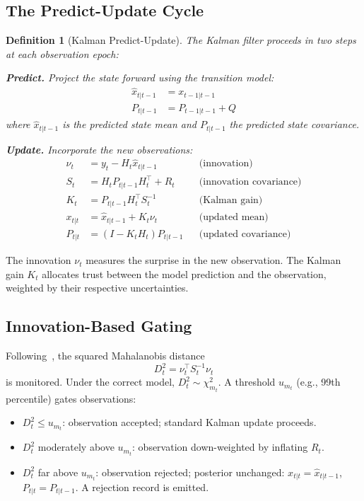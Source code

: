 \documentclass[11pt,a4paper]{article}
\newtheorem{definition}{Definition}[section]
\begin{document}
\subsection{The Predict-Update Cycle}

\begin{definition}[Kalman Predict-Update]
\label{def:kalman}
The Kalman filter proceeds in two steps at each observation epoch:

\textbf{Predict.}  Project the state forward using the transition model:
\begin{align}
\hat{x}_{t|t-1} &= x_{t-1|t-1} \label{eq:predict-mean} \\
P_{t|t-1} &= P_{t-1|t-1} + Q \label{eq:predict-cov}
\end{align}
where $\hat{x}_{t|t-1}$ is the predicted state mean and $P_{t|t-1}$ the predicted state covariance.

\textbf{Update.}  Incorporate the new observations:
\begin{align}
\nu_t &= y_t - H_t \hat{x}_{t|t-1} & &\text{(innovation)} \label{eq:innovation} \\
S_t &= H_t P_{t|t-1} H_t^\top + R_t & &\text{(innovation covariance)} \label{eq:innov-cov} \\
K_t &= P_{t|t-1} H_t^\top S_t^{-1} & &\text{(Kalman gain)} \label{eq:gain} \\
x_{t|t} &= \hat{x}_{t|t-1} + K_t \nu_t & &\text{(updated mean)} \label{eq:update-mean} \\
P_{t|t} &= (I - K_t H_t) P_{t|t-1} & &\text{(updated covariance)} \label{eq:update-cov}
\end{align}
\end{definition}

\noindent The innovation $\nu_t$ measures the surprise in the new observation.  The Kalman gain $K_t$ allocates trust between the model prediction and the observation, weighted by their respective uncertainties.

\subsection{Innovation-Based Gating}
\label{sec:innovation-gating}

Following~\cite{calibration_manifesto}, the squared Mahalanobis distance
\[
D_t^2 = \nu_t^\top S_t^{-1} \nu_t
\]
is monitored.  Under the correct model, $D_t^2 \sim \chi^2_{m_t}$.  A threshold $u_{m_t}$ (e.g., 99th percentile) gates observations:
\begin{itemize}[nosep]
\item $D_t^2 \leq u_{m_t}$: observation accepted; standard Kalman update proceeds.
\item $D_t^2$ moderately above $u_{m_t}$: observation down-weighted by inflating $R_t$.
\item $D_t^2$ far above $u_{m_t}$: observation rejected; posterior unchanged: $x_{t|t} = \hat{x}_{t|t-1}$, $P_{t|t} = P_{t|t-1}$.  A rejection record is emitted.
\end{itemize}
\end{document}
